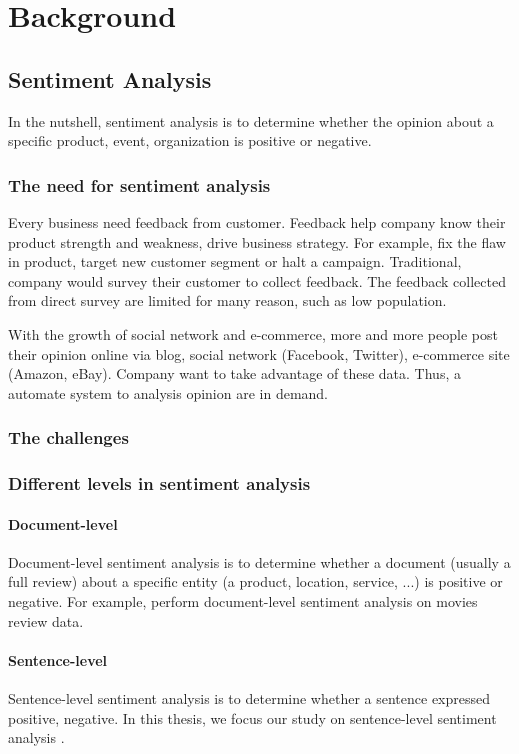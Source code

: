 \chapter{Background}

\section{Sentiment Analysis}
In the nutshell, sentiment analysis is to determine whether the opinion about a specific product, event, organization is positive or negative.
\subsection{The need for sentiment analysis}
Every business need feedback from customer. Feedback help company know their product strength and weakness, drive business strategy. For example, fix the flaw in product, target new customer segment or halt a campaign. Traditional, company would survey their customer to collect feedback.  The feedback collected from direct survey are limited for many reason, such as low population.

With the growth of social network and e-commerce, more and more people post their opinion online via blog, social network (Facebook, Twitter), e-commerce site (Amazon, eBay). Company want to take advantage of these data. Thus, a automate system to analysis opinion are in demand.

\subsection{The challenges}


\subsection{Different levels in sentiment analysis}
\subsubsection{Document-level}
Document-level sentiment analysis is to determine whether a document (usually a full review) about a specific entity (a product, location, service, ...) is positive or negative. For example, \cite{pang2002thumbs} perform document-level sentiment analysis on movies review data.
\subsubsection{Sentence-level}\label{sec:sent-level}
Sentence-level sentiment analysis is to determine whether a sentence expressed positive, negative. In this thesis, we focus our study on sentence-level sentiment analysis \cite{liu2012sentiment}.
